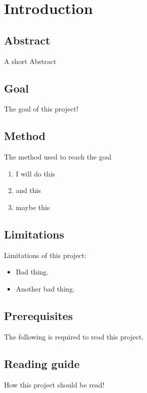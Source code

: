 \chapter{Introduction}
\label{chap:Introduction}
\section{Abstract}
A short Abstract
\section{Goal}
The goal of this project!
\section{Method}
The method used to reach the goal
\begin{enumerate}
  \item I will do this
  \item and this 
  \item maybe this

\end{enumerate}
\section{Limitations}
Limitations of this project:
\begin{itemize}
  \item Bad thing.
  \item Another bad thing.
\end{itemize}
\section{Prerequisites}
The following is required to read this project.

\section{Reading guide}
How this project should be read!
